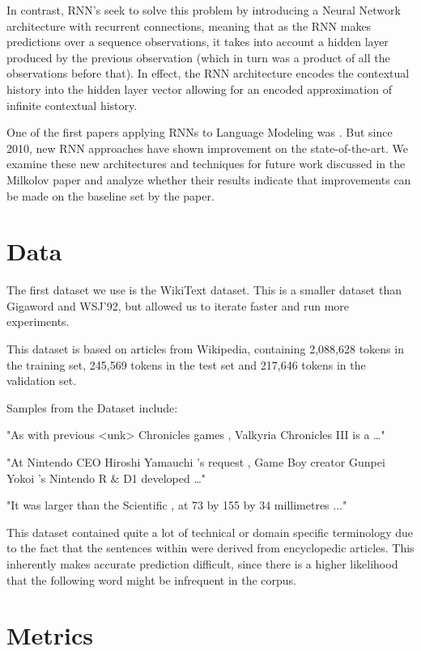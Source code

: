 \documentclass[a4paper]{article}
\begin{document}
In contrast, RNN's seek to solve this problem by introducing a Neural Network
architecture with recurrent connections, meaning that as the RNN makes predictions
over a sequence observations, it takes into account a hidden layer produced
by the previous observation (which in turn was a product of all the observations
before that). In effect, the RNN architecture encodes the contextual history
into the hidden layer vector allowing for an encoded approximation of infinite
contextual history.

One of the first papers applying RNNs to Language Modeling was \cite{Milkolov10}. But since 2010, new RNN approaches have shown
improvement on the state-of-the-art. We examine these new architectures and
techniques for future work discussed in the Milkolov paper and analyze whether their
results indicate that improvements can be made on the baseline set by the paper.

\section{Data}
\label{sec:data}

The first dataset we use is the WikiText dataset. This is a smaller dataset than
Gigaword and WSJ'92, but allowed us to
iterate faster and run more experiments.

This dataset is based on articles from
Wikipedia, containing 2,088,628 tokens
in the training set, 245,569 tokens in
the test set and 217,646 tokens in the
validation set.

Samples from the Dataset include:

"As with previous <unk> Chronicles games , Valkyria Chronicles III is a …"

"At Nintendo CEO Hiroshi Yamauchi 's request , Game Boy creator Gunpei Yokoi 's Nintendo R & D1 developed …"

"It was larger than the Scientific , at 73 by 155 by 34 millimetres ..."

This dataset contained quite a lot of
technical or domain specific
terminology due to the fact that the
sentences within were derived from
encyclopedic articles. This inherently
makes accurate prediction difficult, since
there is a higher likelihood that the
following word might be infrequent in the
corpus.

\section{Metrics}
\label{sec:metrics}
\end{document}
